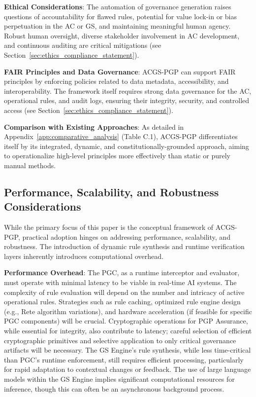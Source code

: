 \documentclass[sigconf,review,anonymous=false]{acmart} %
\begin{document}
\textbf{Ethical Considerations}: The automation of governance generation raises questions of accountability for flawed rules, potential for value lock-in or bias perpetuation in the AC or GS, and maintaining meaningful human agency. Robust human oversight, diverse stakeholder involvement in AC development, and continuous auditing are critical mitigations (see Section~\ref{sec:ethics_compliance_statement}).

\textbf{FAIR Principles and Data Governance}: ACGS-PGP can support FAIR principles by enforcing policies related to data metadata, accessibility, and interoperability. The framework itself requires strong data governance for the AC, operational rules, and audit logs, ensuring their integrity, security, and controlled access (see Section~\ref{sec:ethics_compliance_statement}).

\textbf{Comparison with Existing Approaches}: As detailed in Appendix~\ref{app:comparative_analysis} (Table C.1), ACGS-PGP differentiates itself by its integrated, dynamic, and constitutionally-grounded approach, aiming to operationalize high-level principles more effectively than static or purely manual methods.

\subsection{Performance, Scalability, and Robustness Considerations}
\label{subsec:performance_scalability}
While the primary focus of this paper is the conceptual framework of ACGS-PGP, practical adoption hinges on addressing performance, scalability, and robustness. The introduction of dynamic rule synthesis and runtime verification layers inherently introduces computational overhead.

\textbf{Performance Overhead}: The PGC, as a runtime interceptor and evaluator, must operate with minimal latency to be viable in real-time AI systems. The complexity of rule evaluation will depend on the number and intricacy of active operational rules. Strategies such as rule caching, optimized rule engine design (e.g., Rete algorithm variations), and hardware acceleration (if feasible for specific PGC components) will be crucial. Cryptographic operations for PGP Assurance, while essential for integrity, also contribute to latency; careful selection of efficient cryptographic primitives and selective application to only critical governance artifacts will be necessary. The GS Engine's rule synthesis, while less time-critical than PGC's runtime enforcement, still requires efficient processing, particularly for rapid adaptation to contextual changes or feedback. The use of large language models within the GS Engine implies significant computational resources for inference, though this can often be an asynchronous background process.
\end{document}
